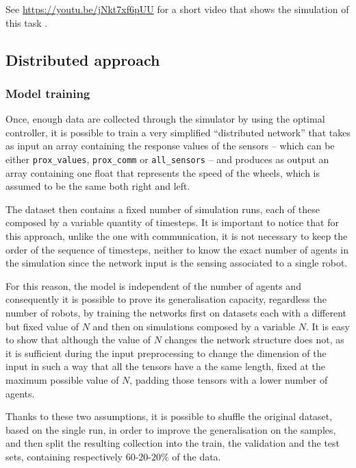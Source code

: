 See \url{https://youtu.be/jNkt7xf6pUU} for a short video that shows the 
simulation of this task \cite[][]{task1manual}.

\subsection{Distributed approach}
\label{subsec:ex1distr}

\subsubsection{Model training}
\label{subsubsec:learneddist}

Once, enough data are collected through the simulator by using the optimal 
controller, it is possible to train a very simplified ``distributed network'' 
that takes as input an array containing the response values of the sensors – 
which can be either \texttt{prox\_values}, \texttt{prox\_comm} or 
\texttt{all\_sensors} – and produces as output an array containing one float 
that represents the speed of the wheels, which is assumed to be the same 
both right and left.

The dataset then contains a fixed number of simulation runs, each of these 
composed by a variable quantity of timesteps. It is important to notice that 
for this approach, unlike the one with communication, it is not necessary to 
keep the order of the sequence of timesteps, neither to know the exact 
number of agents in the simulation since the network input is the sensing 
associated to a single robot.

For this reason, the model is independent of the number of agents and 
consequently it is possible to prove its generalisation capacity, regardless 
the number of robots, by training the networks first on datasets each with a 
different but fixed value of $N$ and then on simulations composed by a 
variable $N$.
It is easy to show that although the value of $N$ changes the network 
structure does not, as it is sufficient during the input preprocessing to 
change the dimension of the input in such a way that all the tensors have a 
the same length, fixed at the maximum possible value of $N$, padding 
those tensors with a lower number of agents.

Thanks to these two assumptions, it is possible to shuffle the original 
dataset, based on the single run, in order to improve the generalisation on 
the samples, and then split the resulting collection into the train, the 
validation and the test sets, containing respectively $60$-$20$-$20\%$ of 
the data. 

